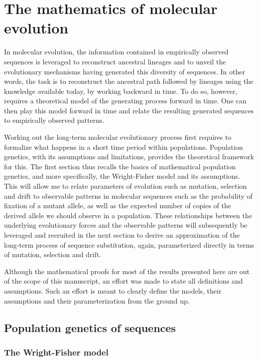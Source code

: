 \thispagestyle{empty}
\chapter{The mathematics of molecular evolution}
{\hypersetup{linkcolor=GREYDARK}\minitoc}
\label{chap:intro-formalism}

In molecular evolution, the information contained in empirically observed sequences is leveraged to reconstruct ancestral lineages and to unveil the evolutionary mechanisms having generated this diversity of sequences.
In other words, the task is to reconstruct the ancestral path followed by lineages using the knowledge available today, by working backward in time.
To do so, however, requires a theoretical model of the generating process forward in time.
One can then play this model forward in time and relate the resulting generated sequences to empirically observed patterns.

Working out the long-term molecular evolutionary process first requires to formalize what happens in a short time period within populations.
Population genetics, with its assumptions and limitations, provides the theoretical framework for this.
The first section thus recalls the basics of mathematical population genetics, and more specifically, the Wright-Fisher model and its assumptions.
This will allow me to relate parameters of evolution such as mutation, selection and drift to observable patterns in molecular sequences such as the probability of fixation of a mutant allele, as well as the expected number of copies of the derived allele we should observe in a population.
These relationships between the underlying evolutionary forces and the observable patterns will subsequently be leveraged and recruited in the next section to derive an approximation of the long-term process of sequence substitution, again, parameterized directly in terms of mutation, selection and drift.

Although the mathematical proofs for most of the results presented here are out of the scope of this manuscript, an effort was made to state all definitions and assumptions.
Such an effort is meant to clearly define the models, their assumptions and their parameterization from the ground up.


\section{Population genetics of sequences}

\subsection{The Wright-Fisher model}

